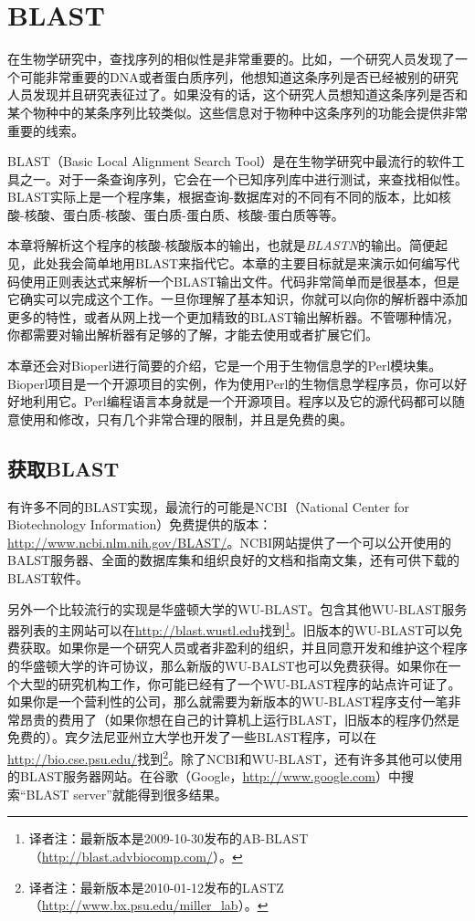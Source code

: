 \chapter{BLAST}
\label{chap:chapter12}
\minitoc

在生物学研究中，查找序列的相似性是非常重要的。比如，一个研究人员发现了一个可能非常重要的DNA或者蛋白质序列，他想知道这条序列是否已经被别的研究人员发现并且研究表征过了。如果没有的话，这个研究人员想知道这条序列是否和某个物种中的某条序列比较类似。这些信息对于物种中这条序列的功能会提供非常重要的线索。

BLAST（Basic Local Alignment Search Tool）是在生物学研究中最流行的软件工具之一。对于一条查询序列，它会在一个已知序列库中进行测试，来查找相似性。BLAST实际上是一个程序集，根据查询-数据库对的不同有不同的版本，比如核酸-核酸、蛋白质-核酸、蛋白质-蛋白质、核酸-蛋白质等等。

本章将解析这个程序的核酸-核酸版本的输出，也就是\textit{BLASTN}的输出。简便起见，此处我会简单地用BLAST来指代它。本章的主要目标就是来演示如何编写代码使用正则表达式来解析一个BLAST输出文件。代码非常简单而是很基本，但是它确实可以完成这个工作。一旦你理解了基本知识，你就可以向你的解析器中添加更多的特性，或者从网上找一个更加精致的BLAST输出解析器。不管哪种情况，你都需要对输出解析器有足够的了解，才能去使用或者扩展它们。

本章还会对Bioperl进行简要的介绍，它是一个用于生物信息学的Perl模块集。Bioperl项目是一个开源项目的实例，作为使用Perl的生物信息学程序员，你可以好好地利用它。Perl编程语言本身就是一个开源项目。程序以及它的源代码都可以随意使用和修改，只有几个非常合理的限制，并且是免费的奥。

\section{获取BLAST}
有许多不同的BLAST实现，最流行的可能是NCBI（National Center for Biotechnology Information）免费提供的版本：\href{http://www.ncbi.nlm.nih.gov/BLAST/}{http://www.ncbi.nlm.nih.gov/BLAST/}。NCBI网站提供了一个可以公开使用的BALST服务器、全面的数据库集和组织良好的文档和指南文集，还有可供下载的BLAST软件。

另外一个比较流行的实现是华盛顿大学的WU-BLAST。包含其他WU-BLAST服务器列表的主网站可以在\href{http://blast.wustl.edu}{http://blast.wustl.edu}找到\footnote{译者注：最新版本是2009-10-30发布的AB-BLAST（\href{http://blast.advbiocomp.com/}{http://blast.advbiocomp.com/}）。}。旧版本的WU-BLAST可以免费获取。如果你是一个研究人员或者非盈利的组织，并且同意开发和维护这个程序的华盛顿大学的许可协议，那么新版的WU-BALST也可以免费获得。如果你在一个大型的研究机构工作，你可能已经有了一个WU-BLAST程序的站点许可证了。如果你是一个营利性的公司，那么就需要为新版本的WU-BLAST程序支付一笔非常昂贵的费用了（如果你想在自己的计算机上运行BLAST，旧版本的程序仍然是免费的）。宾夕法尼亚州立大学也开发了一些BLAST程序，可以在\href{http://bio.cse.psu.edu/}{http://bio.cse.psu.edu/}找到\footnote{译者注：最新版本是2010-01-12发布的LASTZ（\href{http://www.bx.psu.edu/miller\_lab}{http://www.bx.psu.edu/miller\_lab}）。}。除了NCBI和WU-BLAST，还有许多其他可以使用的BLAST服务器网站。在谷歌（Google，\href{http://www.google.com}{http://www.google.com}）中搜索“BLAST server”就能得到很多结果。

